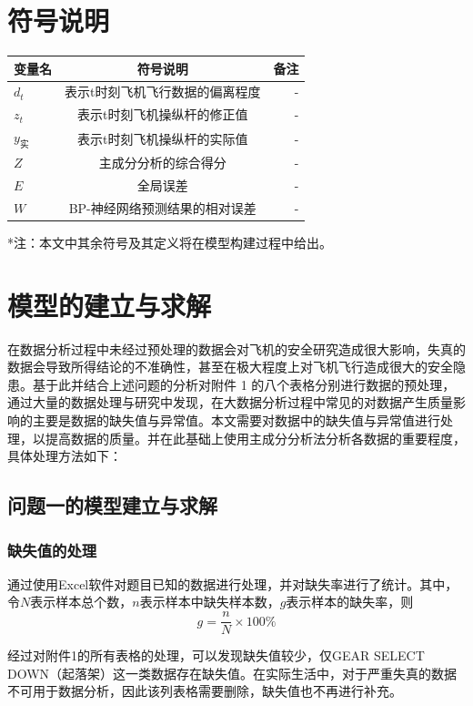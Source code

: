 \documentclass[UTF8]{ctexart}
\begin{document}
	\section{符号说明}\par
	\begin{table}[htbp]
		\centering 
		\begin{tabular}{lcr}
			\toprule
			变量名 & 符号说明 &备注 \\
			\midrule
			${d_t}$ & 表示t时刻飞机飞行数据的偏离程度 &- \\
			${z_t}$ & 表示t时刻飞机操纵杆的修正值   &-\\
			${y_{\text{实}}}$ & 表示t时刻飞机操纵杆的实际值  &- \\
			$Z$ & 主成分分析的综合得分 &-\\
			$E$ & 全局误差 &- \\
			$W$ & BP-神经网络预测结果的相对误差 &-\\
			\bottomrule
		\end{tabular}
	\end{table}
	*注：本文中其余符号及其定义将在模型构建过程中给出。 
	\section{模型的建立与求解}
	在数据分析过程中未经过预处理的数据会对飞机的安全研究造成很大影响，失真的数据会导致所得结论的不准确性，甚至在极大程度上对飞机飞行造成很大的安全隐患。基于此并结合上述问题的分析对附件 1 的八个表格分别进行数据的预处理，通过大量的数据处理与研究中发现，在大数据分析过程中常见的对数据产生质量影响的主要是数据的缺失值与异常值。本文需要对数据中的缺失值与异常值进行处理，以提高数据的质量。并在此基础上使用主成分分析法分析各数据的重要程度，具体处理方法如下： \par
	\subsection{问题一的模型建立与求解}
	\subsubsection{缺失值的处理}
	通过使用Excel软件对题目已知的数据进行处理，并对缺失率进行了统计。其中，令$N$表示样本总个数，$n$表示样本中缺失样本数，$g$表示样本的缺失率，则 
	\begin{equation}
		g=\frac{n}{N}\times 100\%
	\end{equation}\par
	经过对附件1的所有表格的处理，可以发现缺失值较少，仅GEAR SELECT DOWN（起落架）这一类数据存在缺失值。在实际生活中，对于严重失真的数据不可用于数据分析，因此该列表格需要删除，缺失值也不再进行补充。
\end{document}
